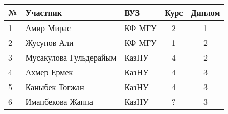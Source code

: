 \begin{center}
\begin{tabular}{|l|l|l|c|c|}
\hline
№ & Участник & ВУЗ & Курс & Диплом \\
\hline
1 & Амир Мирас & КФ МГУ & 2 & 1  \\
\hline
2 & Жусупов Али & КФ МГУ & 1 & 2  \\
\hline
3 & Мусакулова Гульдерайым & КазНУ & 4 & 2  \\
\hline
4 & Ахмер Ермек & КазНУ & 4 & 3  \\
\hline
5 & Каныбек Тогжан & КазНУ & 4 & 3  \\
\hline
6 & Иманбекова Жанна & КазНУ & ? & 3  \\
\hline
\end{tabular}
\end{center}
